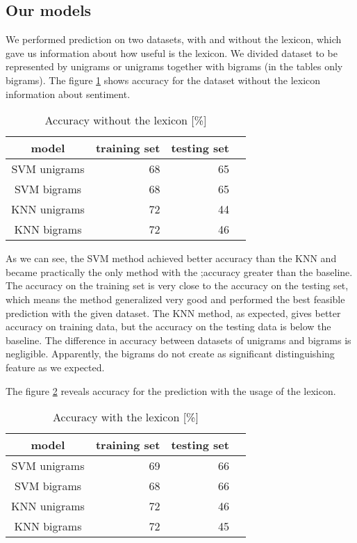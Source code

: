 \documentclass{sig-alternate}
\begin{document}
\subsection{Our models}
We performed prediction on two datasets, with and without the lexicon, which gave us information about how useful is the lexicon.
We divided dataset to be represented by unigrams or unigrams together with bigrams (in the tables only bigrams).
The figure \ref{without} shows accuracy for the dataset without the lexicon information about sentiment.

\begin{table}[h]
\centering
\caption{Accuracy without the lexicon [\%]}
\label{without}
\begin{tabular}{|c|r|r|r|} \hline
model & training set & testing set  \\ \hline
SVM unigrams & 68 & 65 \\ \hline
SVM bigrams & 68 & 65 \\ \hline
KNN unigrams & 72 & 44 \\ \hline
KNN bigrams & 72 & 46 \\ \hline
\end{tabular}
\end{table}

As we can see, the SVM method achieved better accuracy than the KNN and became practically the only method with the ;accuracy greater than the baseline.
The accuracy on the training set is very close to the accuracy on the testing set, which means the method generalized very good and performed the best feasible prediction with the given dataset.
The KNN method, as expected, gives better accuracy on training data, but the accuracy on the testing data is below the baseline.
The difference in accuracy between datasets of unigrams and bigrams is negligible.
Apparently, the bigrams do not create as significant distinguishing feature as we expected.

The figure \ref{with} reveals accuracy for the prediction with the usage of the lexicon.

\begin{table}[h]
\centering
\caption{Accuracy with the lexicon [\%]}
\label{with}
\begin{tabular}{|c|r|r|r|} \hline
model & training set & testing set  \\ \hline
SVM unigrams & 69 & 66 \\ \hline
SVM bigrams & 68 & 66 \\ \hline
KNN unigrams & 72 & 46 \\ \hline
KNN bigrams & 72 & 45 \\ \hline
\end{tabular}
\end{table}
\end{document}
